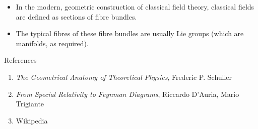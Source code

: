 \documentclass[9pt,handout]{beamer}
\begin{document}
\begin{frame}{}
\begin{itemize}
\item In the modern, geometric construction of classical field theory, classical fields are defined as sections of fibre bundles.
\item The typical fibres of these fibre bundles are usually Lie groups (which are manifolds, as required).
\end{itemize}
\end{frame}

\begin{frame}{References}
\begin{enumerate}
\item \emph{The Geometrical Anatomy of Theoretical Physics}, Frederic P. Schuller
\item \emph{From Special Relativity to Feynman Diagrams}, Riccardo D'Auria, Mario Trigiante
\item Wikipedia
\end{enumerate}
\end{frame}

\end{document}

